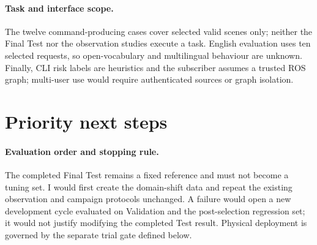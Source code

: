 \paragraph{Task and interface scope.}
The twelve command-producing cases cover selected valid scenes only; neither
the Final Test nor the observation studies execute a task. English evaluation
uses ten selected requests, so open-vocabulary and multilingual behaviour are
unknown. Finally, CLI risk labels are heuristics and the subscriber assumes a
trusted ROS graph; multi-user use would require authenticated sources or graph
isolation.

\section{Priority next steps}

\paragraph{Evaluation order and stopping rule.}
The completed Final Test remains a fixed reference and must not become a tuning
set. I would first create the domain-shift data and repeat the existing
observation and campaign protocols unchanged. A failure would open a new
development cycle evaluated on Validation and the post-selection regression
set; it would not justify modifying the completed Test result. Physical
deployment is governed by the separate trial gate defined below.

